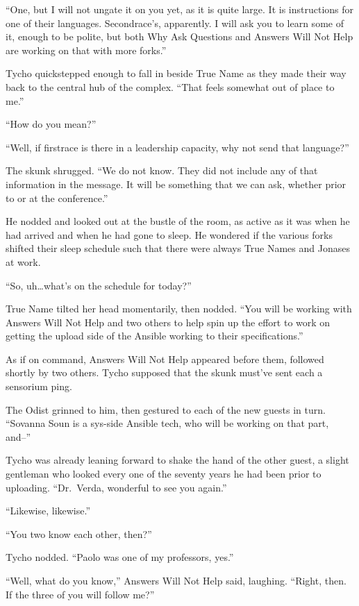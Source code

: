 ``One, but I will not ungate it on you yet, as it is quite large. It is instructions for one of their languages. Secondrace's, apparently. I will ask you to learn some of it, enough to be polite, but both Why Ask Questions and Answers Will Not Help are working on that with more forks.''

Tycho quickstepped enough to fall in beside True Name as they made their way back to the central hub of the complex. ``That feels somewhat out of place to me.''

``How do you mean?''

``Well, if firstrace is there in a leadership capacity, why not send that language?''

The skunk shrugged. ``We do not know. They did not include any of that information in the message. It will be something that we can ask, whether prior to or at the conference.''

He nodded and looked out at the bustle of the room, as active as it was when he had arrived and when he had gone to sleep. He wondered if the various forks shifted their sleep schedule such that there were always True Names and Jonases at work.

``So, uh\ldots what's on the schedule for today?''

True Name tilted her head momentarily, then nodded. ``You will be working with Answers Will Not Help and two others to help spin up the effort to work on getting the upload side of the Ansible working to their specifications.''

As if on command, Answers Will Not Help appeared before them, followed shortly by two others. Tycho supposed that the skunk must've sent each a sensorium ping.

The Odist grinned to him, then gestured to each of the new guests in turn. ``Sovanna Soun is a sys-side Ansible tech, who will be working on that part, and--''

Tycho was already leaning forward to shake the hand of the other guest, a slight gentleman who looked every one of the seventy years he had been prior to uploading. ``Dr.~Verda, wonderful to see you again.''

``Likewise, likewise.''

``You two know each other, then?''

Tycho nodded. ``Paolo was one of my professors, yes.''

``Well, what do you know,'' Answers Will Not Help said, laughing. ``Right, then. If the three of you will follow me?''

